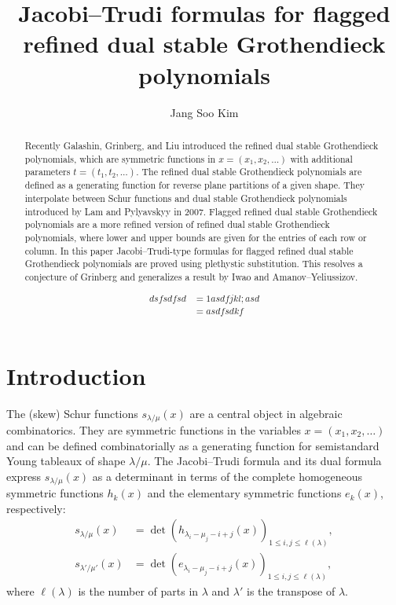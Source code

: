 \documentclass[12pt]{amsart}
\title[Jacobi--Trudi formulas for flagged dual Grothendieck
polynomials]{Jacobi--Trudi formulas for flagged refined dual stable Grothendieck
  polynomials}
\author{Jang Soo Kim}
\numberwithin{equation}{section}
\theoremstyle{definition}
\newcommand\lm{{\lambda/\mu}}
\begin{document}
\begin{abstract}
  Recently Galashin, Grinberg, and Liu introduced the refined dual stable
  Grothendieck polynomials, which are symmetric functions in $x=(x_1,x_2,\dots)$
  with additional parameters $t=(t_1,t_2,\dots)$. The refined dual stable
  Grothendieck polynomials are defined as a generating function for reverse
  plane partitions of a given shape. They interpolate between Schur functions
  and dual stable Grothendieck polynomials introduced by Lam and Pylyavskyy in
  2007. Flagged refined dual stable Grothendieck polynomials are a more refined
  version of refined dual stable Grothendieck polynomials, where lower and upper
  bounds are given for the entries of each row or column. In this paper
  Jacobi--Trudi-type formulas for flagged refined dual stable Grothendieck
  polynomials are proved using plethystic substitution. This resolves a
  conjecture of Grinberg and generalizes a result by Iwao and
  Amanov--Yeliussizov.
  
  \begin{align*}
    dsfsdfsd &= 1asdfjkl;asd\\
    &= asdfsdkf
  \end{align*}
  
\end{abstract}

\maketitle

\section{Introduction}

The (skew) Schur functions $s_{\lm}(x)$ are a central object in algebraic
combinatorics. They are symmetric functions in the variables $x=(x_1,x_2,\dots)$
and can be defined combinatorially as a generating function for semistandard
Young tableaux of shape $\lm$. The Jacobi--Trudi formula and its dual formula
express $s_{\lm}(x)$ as a determinant in terms of the complete homogeneous
symmetric functions $h_k(x)$ and the elementary symmetric functions $e_k(x)$,
respectively:
\begin{align}
  \label{eq:s=det h}
  s_{\lambda/\mu}(x) &= \det
  \left( h_{\lambda_i-\mu_j-i+j} (x) \right)_{1\le i,j\le \ell(\lambda)},\\
  \label{eq:s=det e}
  s_{\lambda'/\mu'}(x) &= \det
  \left( e_{\lambda_i-\mu_j-i+j} (x) \right)_{1\le i,j\le \ell(\lambda)},
\end{align}
where $\ell(\lambda)$ is the number of parts in $\lambda$ and $\lambda'$ is the
transpose of $\lambda$.
\end{document}
